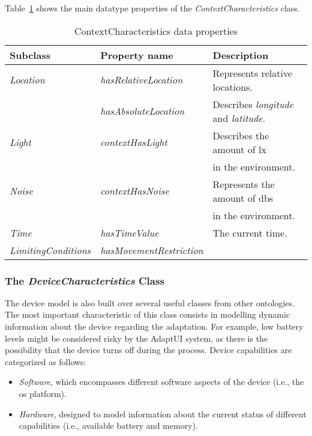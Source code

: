 Table~\ref{tbl:context_characteristics_ontology} shows the main datatype properties
of the \textit{ContextCharacteristics} class.

\begin{table}[H]
  \caption{ContextCharacteristics data properties}
 \label{tbl:context_characteristics_ontology}
\footnotesize
\centering
 \begin{tabular}{l l l}
  \hline 
  \textbf{Subclass} 	& \textbf{Property name} 	& \textbf{Description}		\\
  \hline
  \textit{Location}	& \textit{hasRelativeLocation}	& Represents relative locations.\\
			& \textit{hasAbsoluteLocation}	& Describes \textit{longitude} and \textit{latitude}.\\
  \textit{Light}	& \textit{contextHasLight}	& Describes the amount of \ac{lx}\\
			& 				& in the environment.		\\
  \textit{Noise}	& \textit{contextHasNoise}	& Represents the amount of \acp{db}\\
			& 				& in the environment.		\\
  \textit{Time}		& \textit{hasTimeValue}		& The current time.		\\
  \textit{LimitingConditions}& \textit{hasMovementRestriction}&				\\
  \hline
  
\end{tabular}
\end{table}



\subsubsection{The \textit{DeviceCharacteristics} Class}
\label{sec:device_characteristics_class}

The device model is also built over several useful classes from other ontologies.
The most important characteristic of this class consists in modelling dynamic
information about the device regarding the adaptation. For example, low battery
levels might be considered risky by the AdaptUI system, as there is the possibility
that the device turns off during the process. Device capabilities are categorized
as follows:

\begin{itemize}
 \item \textit{Software}, which encompasses different software aspects of the
 device (i.e., the \ac{os} platform). 
 
 \item \textit{Hardware}, designed to model information about the current status
 of different capabilities (i.e., available battery and memory).
\end{itemize}


